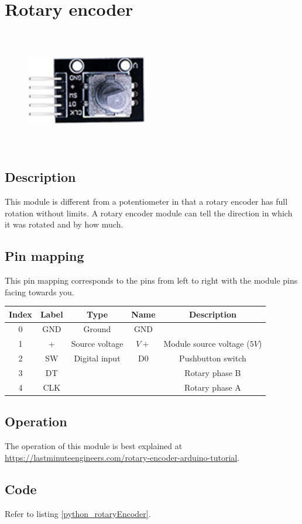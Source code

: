 \section{Rotary encoder}
\begin{figure}[H]
    \centering
    \includegraphics[angle=0, keepaspectratio=true, scale=1, width=200px, height=200px]{images/rotary.jpg}
\end{figure}
\subsection*{Description}
This module is different from a potentiometer in that a rotary encoder has full rotation without limits. A rotary encoder module can tell the direction in which it was rotated and by how much.
\subsection*{Pin mapping}
This pin mapping corresponds to the pins from left to right with the module pins facing towards you.
\begin{table}[H]
    \centering
    \begin{tabular}{|c|c|c|c|c|}
    \hline
    Index &Label &Type &Name &Description\\ \hline
    0 &GND &Ground &GND &\\ \hline
    1 &+ &Source voltage &$V+$ &Module source voltage ($5V$)\\ \hline
    2 &SW &Digital input &D0 &Pushbutton switch\\ \hline
    3 &DT & & &Rotary phase B\\ \hline
    4 &CLK & & &Rotary phase A\\ \hline
    \end{tabular}
\end{table}
\subsection*{Operation}
The operation of this module is best explained at \href{https://lastminuteengineers.com/rotary-encoder-arduino-tutorial}{https://lastminuteengineers.com/rotary-encoder-arduino-tutorial}.
\subsection*{Code}
Refer to listing \ref{python_rotaryEncoder}.

